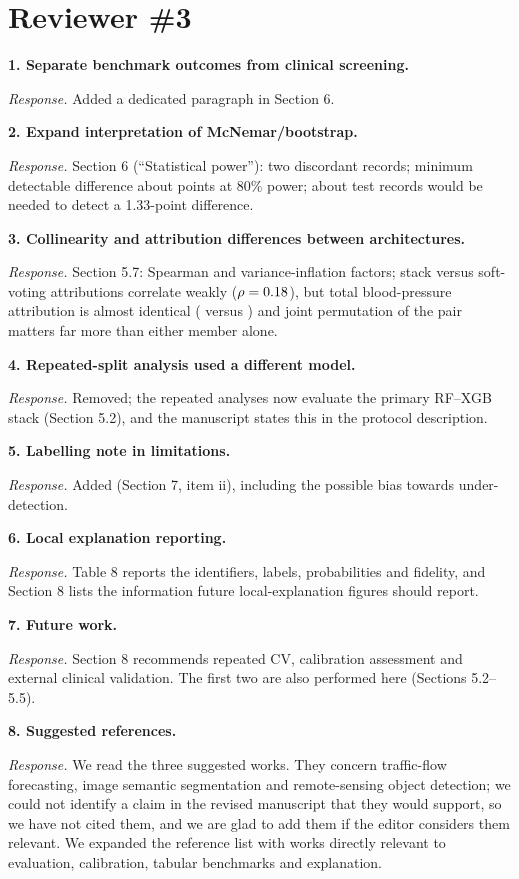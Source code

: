 \documentclass[11pt,a4paper]{article}
\newcommand{\rc}[1]{\par\smallskip\noindent\textbf{#1}\par}
\newcommand{\ans}{\noindent\textit{Response.} }
\begin{document}
\section*{Reviewer \#3}
\rc{1. Separate benchmark outcomes from clinical screening.}\ans Added a dedicated paragraph in Section 6.
\rc{2. Expand interpretation of McNemar/bootstrap.}\ans Section 6 (``Statistical power''): two discordant records; minimum detectable difference about \OrigMDE{} points at 80\% power; about \NReq{} test records would be needed to detect a 1.33-point difference.
\rc{3. Collinearity and attribution differences between architectures.}\ans Section 5.7: Spearman and variance-inflation factors; stack versus soft-voting attributions correlate weakly ($\rho=0.18$), but total blood-pressure attribution is almost identical (\BlockBPStack{} versus \BlockBPVote) and joint permutation of the pair matters far more than either member alone.
\rc{4. Repeated-split analysis used a different model.}\ans Removed; the repeated analyses now evaluate the primary RF--XGB stack (Section 5.2), and the manuscript states this in the protocol description.
\rc{5. Labelling note in limitations.}\ans Added (Section 7, item ii), including the possible bias towards under-detection.
\rc{6. Local explanation reporting.}\ans Table 8 reports the identifiers, labels, probabilities and fidelity, and Section 8 lists the information future local-explanation figures should report.
\rc{7. Future work.}\ans Section 8 recommends repeated CV, calibration assessment and external clinical validation. The first two are also performed here (Sections 5.2--5.5).
\rc{8. Suggested references.}\ans We read the three suggested works. They concern traffic-flow forecasting, image semantic segmentation and remote-sensing object detection; we could not identify a claim in the revised manuscript that they would support, so we have not cited them, and we are glad to add them if the editor considers them relevant. We expanded the reference list with works directly relevant to evaluation, calibration, tabular benchmarks and explanation.
\end{document}
